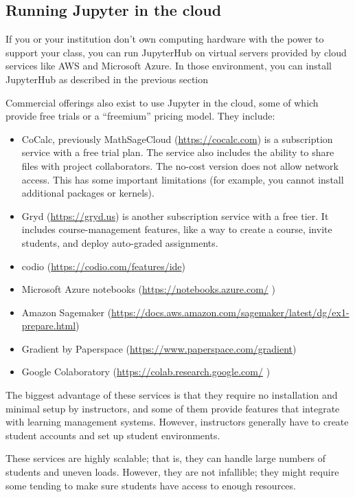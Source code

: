 \documentclass[]{book}
\begin{document}
\subsection{Running Jupyter in the
cloud}\label{running-jupyter-in-the-cloud}

If you or your institution don't own computing hardware with the power
to support your class, you can run JupyterHub on virtual servers
provided by cloud services like AWS and Microsoft Azure. In those
environment, you can install JupyterHub as described in the previous
section

Commercial offerings also exist to use Jupyter in the cloud, some of
which provide free trials or a ``freemium'' pricing model. They include:

\begin{itemize}
\item
  CoCalc, previously MathSageCloud (\url{https://cocalc.com}) is a
  subscription service with a free trial plan. The service also includes
  the ability to share files with project collaborators. The no-cost
  version does not allow network access. This has some important
  limitations (for example, you cannot install additional packages or
  kernels).
\item
  Gryd (\url{https://gryd.us}) is another subscription service with a
  free tier. It includes course-management features, like a way to
  create a course, invite students, and deploy auto-graded assignments.
\item
  codio (\url{https://codio.com/features/ide})
\item
  Microsoft Azure notebooks (\url{https://notebooks.azure.com/} )
\item
  Amazon Sagemaker
  (\url{https://docs.aws.amazon.com/sagemaker/latest/dg/ex1-prepare.html})
\item
  Gradient by Paperspace (\url{https://www.paperspace.com/gradient})
\item
  Google Colaboratory (\url{https://colab.research.google.com/} )
\end{itemize}

The biggest advantage of these services is that they require no
installation and minimal setup by instructors, and some of them provide
features that integrate with learning management systems. However,
instructors generally have to create student accounts and set up student
environments.

These services are highly scalable; that is, they can handle large
numbers of students and uneven loads. However, they are not infallible;
they might require some tending to make sure students have access to
enough resources.
\end{document}
